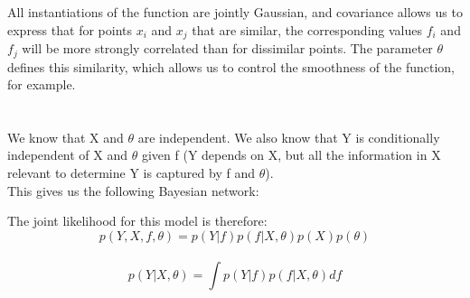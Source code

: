 \documentclass[a4paper,11pt]{article}
\theoremstyle{mytheor}
\begin{document}
All instantiations of the function are jointly Gaussian, and covariance allows us to express that for points $x_i$ and $x_j$ that are similar, the corresponding values $f_i$ and $f_j$ will be more strongly correlated than for dissimilar points. The parameter $\theta$ defines this similarity, which allows us to control the smoothness of the function, for example.
\smallskip
\\\\
\smallskip
\\ We know that X and $\theta$ are independent. We also know that Y is conditionally independent of X and $\theta$ given f (Y depends on X, but all the information in X relevant to determine Y is captured by f and $\theta$).\\
This gives us the following Bayesian network:\\
\begin{center}
\end{center}
The joint likelihood for this model is therefore:
\begin{equation*}
p(Y,X,f,\theta) = p(Y|f) p(f|X,\theta) p(X) p(\theta)
\end{equation*}
\smallskip
\\
\smallskip
\begin{equation*}
 p(Y|X,\theta) = \int p(Y|f)p(f|X,\theta)df
\end{equation*}
\end{document}
